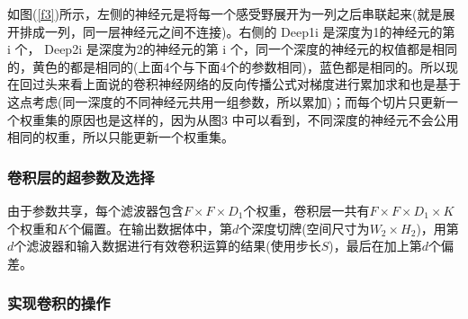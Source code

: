 \documentclass[UTF-8, a4paper, 12pt]{ctexart}
\begin{document}
如图(\ref{f3})所示，左侧的神经元是将每一个感受野展开为一列之后串联起来(就是展开排成一列，同一层神经元之间不连接)。右侧的 Deep1i 是深度为1的神经元的第 i 个， Deep2i 是深度为2的神经元的第 i 个，同一个深度的神经元的权值都是相同的，黄色的都是相同的(上面4个与下面4个的参数相同)，蓝色都是相同的。所以现在回过头来看上面说的卷积神经网络的反向传播公式对梯度进行累加求和也是基于这点考虑(同一深度的不同神经元共用一组参数，所以累加)；而每个切片只更新一个权重集的原因也是这样的，因为从图3 中可以看到，不同深度的神经元不会公用相同的权重，所以只能更新一个权重集。

\subsubsection{卷积层的超参数及选择}

由于参数共享，每个滤波器包含$F\times F \times D_1$个权重，卷积层一共有$F\times F\times D_1\times K$个权重和$K$个偏置。在输出数据体中，第$d$个深度切牌(空间尺寸为$W_2\times H_2$)，用第$d$个滤波器和输入数据进行有效卷积运算的结果(使用步长$S$)，最后在加上第$d$个偏差。

\subsubsection{实现卷积的操作}
\end{document}
